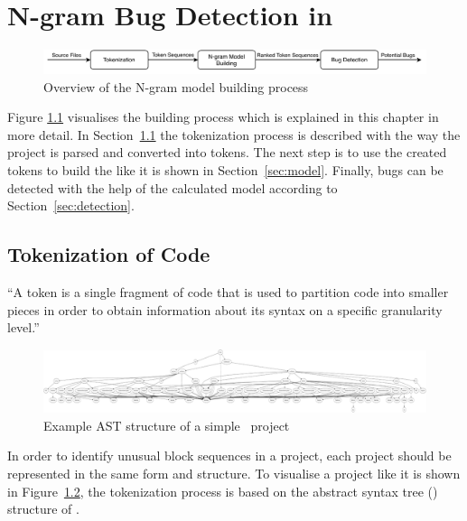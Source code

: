 \chapter{N-gram Bug Detection in \scratch{}}\label{chap:methods}

\begin{figure}[hbtp]
\centering
\includegraphics[scale=0.75]{images/Overview.pdf}
\caption{Overview of the N-gram model building process}
\label{fig:overview}
\end{figure}

Figure \ref{fig:overview} visualises the \ngram{} building process which is explained in this chapter in more detail. In Section~\ref{sec:tokenization} the tokenization process is described with the way the \scratch{} project is parsed and converted into tokens. The next step is to use the created tokens to build the \ngram{} like it is shown in Section~\ref{sec:model}. Finally, bugs can be detected with the help of the calculated model according to Section~\ref{sec:detection}.

\section{Tokenization of \scratch{} Code}\label{sec:tokenization}

\begin{definition}[Token]\label{def:token}
    ``A token is a single fragment of \scratch{} code that is used to partition code into smaller pieces in order to obtain information about its syntax on a specific granularity level.''
\end{definition}

\begin{figure}[hbtp]
\centering
\includegraphics[scale=0.20]{images/AST_example(3).png}
\caption{Example AST structure of a simple \scratch\ project}
\label{fig:ast}
\end{figure}

In order to identify unusual block sequences in a \scratch{} project, each project should be represented in the same form and structure. To visualise a \scratch{} project like it is shown in Figure~\ref{fig:ast}, the tokenization process is based on the abstract syntax tree (\AST{}) structure of \litterbox{}. 

